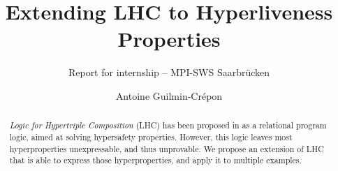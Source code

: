\documentclass[acmsmall,screen,nonacm,appendix]{acmart}
\title{Extending LHC to Hyperliveness Properties}
\subtitle{Report for internship -- MPI-SWS Saarbrücken}
\author{Antoine Guilmin-Crépon}
\affiliation{%
  \institution{ENS Paris-Saclay}
  \city{Gif-Sur-Yvette}
  \country{France}
}
\begin{document}
\begin{abstract}
  \emph{Logic for Hypertriple Composition} (LHC) has been proposed in \citet{DOsualdo22} as a relational program logic, aimed at solving hypersafety properties. However, this logic leaves most hyperproperties unexpressable, and thus unprovable. We propose an extension of LHC that is able to express those hyperproperties, and apply it to multiple examples. 
\end{abstract}

\maketitle










\newpage

\end{document}
